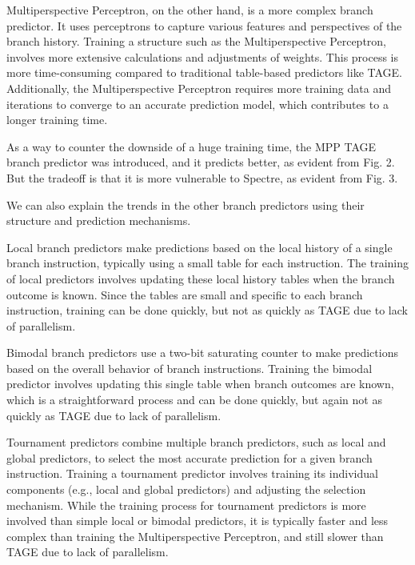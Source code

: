 \documentclass[twocolumn,showpacs,%
  nofootinbib,aps,superscriptaddress,%
  eqsecnum,prd,notitlepage,showkeys,10pt]{revtex4-1}
\begin{document}
Multiperspective Perceptron, on the other hand, is a more complex branch predictor. It uses perceptrons to capture various features and perspectives of the branch history. Training a structure such as the Multiperspective Perceptron, involves more extensive calculations and adjustments of weights. This process is more time-consuming compared to traditional table-based predictors like TAGE. Additionally, the Multiperspective Perceptron requires more training data and iterations to converge to an accurate prediction model, which contributes to a longer training time.\cite{jimenez2001dynamic}

As a way to counter the downside of a huge training time, the MPP TAGE branch predictor was introduced, and it predicts better, as evident from Fig. 2. But the tradeoff is that it is more vulnerable to Spectre, as evident from Fig. 3.

We can also explain the trends in the other branch predictors using their structure and prediction mechanisms.

Local branch predictors make predictions based on the local history of a single branch instruction, typically using a small table for each instruction. The training of local predictors involves updating these local history tables when the branch outcome is known. Since the tables are small and specific to each branch instruction, training can be done quickly, but not as quickly as TAGE due to lack of parallelism.\cite{mcfarling1993combining}

Bimodal branch predictors use a two-bit saturating counter to make predictions based on the overall behavior of branch instructions. Training the bimodal predictor involves updating this single table when branch outcomes are known, which is a straightforward process and can be done quickly, but again not as quickly as TAGE due to lack of parallelism.\cite{peress2008historical}

Tournament predictors combine multiple branch predictors, such as local and global predictors, to select the most accurate prediction for a given branch instruction. Training a tournament predictor involves training its individual components (e.g., local and global predictors) and adjusting the selection mechanism. While the training process for tournament predictors is more involved than simple local or bimodal predictors, it is typically faster and less complex than training the Multiperspective Perceptron, and still slower than TAGE due to lack of parallelism.\cite{mcfarling1993combining}
\end{document}
